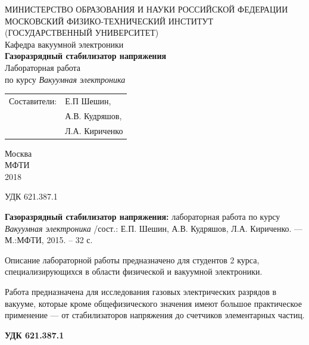 \documentclass[a4paper, 12pt]{article}
\begin{document}
	\begin{titlepage}
		\begin{center}
			\small
			МИНИСТЕРСТВО ОБРАЗОВАНИЯ И НАУКИ РОССИЙСКОЙ ФЕДЕРАЦИИ\\
			МОСКОВСКИЙ ФИЗИКО-ТЕХНИЧЕСКИЙ ИНСТИТУТ\\
			(ГОСУДАРСТВЕННЫЙ УНИВЕРСИТЕТ)\\
			\vspace{0.2cm}
			Кафедра вакуумной электроники\\
			\vspace{3cm}
			\large
			\textbf{Газоразрядный стабилизатор напряжения}\\
			\vspace{0.2cm}
			\small
			Лабораторная работа\\ по курсу \textit{Вакуумная электроника}\\
			\vspace{5cm}
			\begin{table}[h]
				\centering
				\begin{tabular}{cl}
					Составители: &Е.П Шешин,\\
					&А.В. Кудряшов,\\
					&Л.А. Кириченко
				\end{tabular}
			\end{table}
			\vspace{4.8cm}
			\small
			Москва\\МФТИ\\2018
		\end{center}
	\end{titlepage}
	\newpage
	УДК 621.387.1\\
	\vspace{0.2cm}
	
	\textbf{Газоразрядный стабилизатор напряжения: } лабораторная работа по курсу \textit{Вакуумная электроника} /сост.: Е.П. Шешин, А.В. Кудряшов, Л.А. Кириченко. — М.:МФТИ, 2015. – 32 с.\par
	\vspace{0.4cm}
	Описание лабораторной работы предназначено для студентов 2 курса, специализирующихся в области физической и вакуумной электроники.\par
	Работа предназначена для исследования газовых электрических разрядов в вакууме, которые кроме общефизического значения имеют большое практическое применение — от стабилизаторов напряжения до счетчиков элементарных частиц.\par
	\begin{flushright}
	\textbf{	УДК 621.387.1}\\
	\end{flushright}
	\newpage
	\tableofcontents
	\newpage
\end{document}
